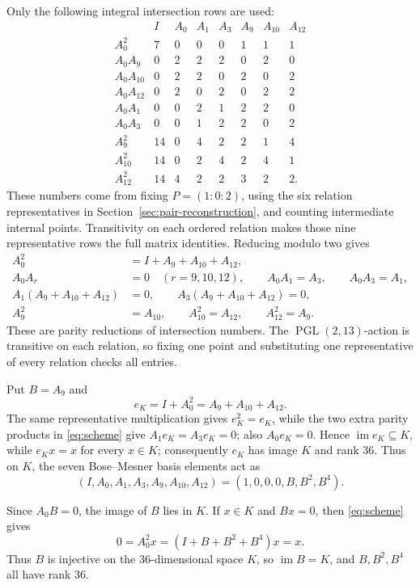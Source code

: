\documentclass[11pt]{article}
\theoremstyle{definition}
\theoremstyle{remark}
\newcommand{\PGL}{\operatorname{PGL}}
\begin{document}
Only the following integral intersection rows are used:
\[
\begin{array}{c|rrrrrrr}
 &I&A_0&A_1&A_3&A_9&A_{10}&A_{12}\\ \hline
A_0^2   &7&0&0&0&1&1&1\\
A_0A_9  &0&2&2&2&0&2&0\\
A_0A_{10}&0&2&2&0&2&0&2\\
A_0A_{12}&0&2&0&2&0&2&2\\
A_0A_1  &0&0&2&1&2&2&0\\
A_0A_3  &0&0&1&2&2&0&2\\
A_9^2   &14&0&4&2&2&1&4\\
A_{10}^2&14&0&2&4&2&4&1\\
A_{12}^2&14&4&2&2&3&2&2.
\end{array}
\]
These numbers come from fixing \(P=(1:0:2)\), using the six relation
representatives in Section~\ref{sec:pair-reconstruction}, and counting
intermediate internal points.
Transitivity on each ordered relation makes those nine representative rows
the full matrix identities.  Reducing modulo two gives
\begin{equation}
\label{eq:scheme}
\begin{split}
 A_0^2&=I+A_9+A_{10}+A_{12},\\
 A_0A_r&=0\quad(r=9,10,12),\qquad A_0A_1=A_3,\qquad A_0A_3=A_1,\\
 A_1(A_9+A_{10}+A_{12})&=0,\qquad
 A_3(A_9+A_{10}+A_{12})=0,\\
 A_9^2&=A_{10},\qquad A_{10}^2=A_{12},\qquad A_{12}^2=A_9.
\end{split}
\end{equation}
These are parity reductions of intersection numbers.  The
\(\PGL(2,13)\)-action is transitive on each relation, so fixing one point and
substituting one representative of every relation checks all entries.

Put \(B=A_9\) and
\[
 e_K=I+A_0^2=A_9+A_{10}+A_{12}.
\]
The same representative multiplication gives
\(e_K^2=e_K\), while the two extra parity products in
\eqref{eq:scheme} give \(A_1e_K=A_3e_K=0\); also
\(A_0e_K=0\).  Hence \(\operatorname{im}e_K\subseteq K\), while
\(e_Kx=x\) for every \(x\in K\); consequently \(e_K\) has image \(K\) and
rank \(36\).  Thus on \(K\), the seven Bose--Mesner basis elements act as
\[
 (I,A_0,A_1,A_3,A_9,A_{10},A_{12})
 =(1,0,0,0,B,B^2,B^4).
\]

Since \(A_0B=0\), the image of \(B\) lies in \(K\).  If
\(x\in K\) and \(Bx=0\), then \eqref{eq:scheme} gives
\[
 0=A_0^2x=(I+B+B^2+B^4)x=x.
\]
Thus \(B\) is injective on the 36-dimensional space \(K\), so
\(\operatorname{im}B=K\), and \(B,B^2,B^4\) all have rank 36.
\end{document}
